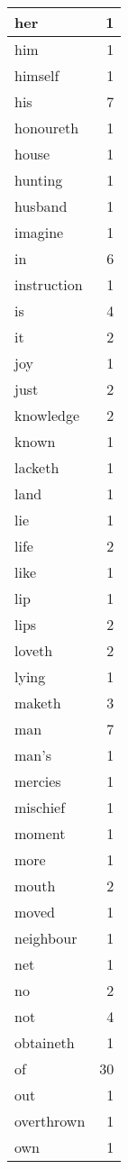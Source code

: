 \begin{center}
\begin{longtable}{l|r}
her & 1\\ \hline 
him & 1\\ \hline 
himself & 1\\ \hline 
his & 7\\ \hline 
honoureth & 1\\ \hline 
house & 1\\ \hline 
hunting & 1\\ \hline 
husband & 1\\ \hline 
imagine & 1\\ \hline 
in & 6\\ \hline 
instruction & 1\\ \hline 
is & 4\\ \hline 
it & 2\\ \hline 
joy & 1\\ \hline 
just & 2\\ \hline 
knowledge & 2\\ \hline 
known & 1\\ \hline 
lacketh & 1\\ \hline 
land & 1\\ \hline 
lie & 1\\ \hline 
life & 2\\ \hline 
like & 1\\ \hline 
lip & 1\\ \hline 
lips & 2\\ \hline 
loveth & 2\\ \hline 
lying & 1\\ \hline 
maketh & 3\\ \hline 
man & 7\\ \hline 
man's & 1\\ \hline 
mercies & 1\\ \hline 
mischief & 1\\ \hline 
moment & 1\\ \hline 
more & 1\\ \hline 
mouth & 2\\ \hline 
moved & 1\\ \hline 
neighbour & 1\\ \hline 
net & 1\\ \hline 
no & 2\\ \hline 
not & 4\\ \hline 
obtaineth & 1\\ \hline 
of & 30\\ \hline 
out & 1\\ \hline 
overthrown & 1\\ \hline 
own & 1\\ \hline 

\end{longtable}
\end{center}
